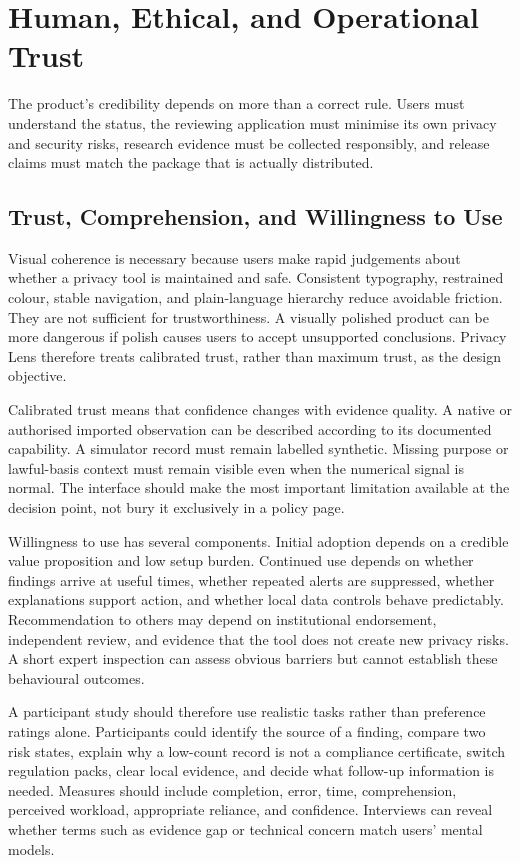 \section{Human, Ethical, and Operational Trust}

The product's credibility depends on more than a correct rule. Users must understand the status, the reviewing application must minimise its own privacy and security risks, research evidence must be collected responsibly, and release claims must match the package that is actually distributed.

\subsection{Trust, Comprehension, and Willingness to Use}

Visual coherence is necessary because users make rapid judgements about whether a privacy tool is maintained and safe. Consistent typography, restrained colour, stable navigation, and plain-language hierarchy reduce avoidable friction. They are not sufficient for trustworthiness. A visually polished product can be more dangerous if polish causes users to accept unsupported conclusions. Privacy Lens therefore treats calibrated trust, rather than maximum trust, as the design objective.

Calibrated trust means that confidence changes with evidence quality. A native or authorised imported observation can be described according to its documented capability. A simulator record must remain labelled synthetic. Missing purpose or lawful-basis context must remain visible even when the numerical signal is normal. The interface should make the most important limitation available at the decision point, not bury it exclusively in a policy page.

Willingness to use has several components. Initial adoption depends on a credible value proposition and low setup burden. Continued use depends on whether findings arrive at useful times, whether repeated alerts are suppressed, whether explanations support action, and whether local data controls behave predictably. Recommendation to others may depend on institutional endorsement, independent review, and evidence that the tool does not create new privacy risks. A short expert inspection can assess obvious barriers but cannot establish these behavioural outcomes.

A participant study should therefore use realistic tasks rather than preference ratings alone. Participants could identify the source of a finding, compare two risk states, explain why a low-count record is not a compliance certificate, switch regulation packs, clear local evidence, and decide what follow-up information is needed. Measures should include completion, error, time, comprehension, perceived workload, appropriate reliance, and confidence. Interviews can reveal whether terms such as evidence gap or technical concern match users' mental models.

